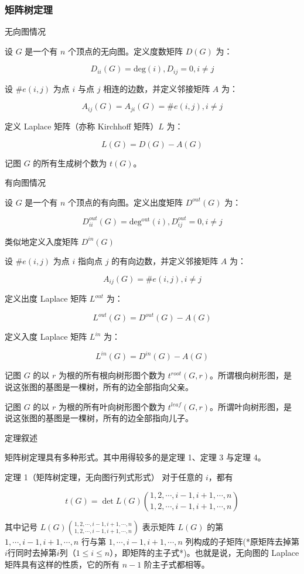 \documentclass[UTF8]{ctexart}
\begin{document}
\subsubsection{矩阵树定理}

无向图情况

设 $G$ 是一个有 $n$ 个顶点的无向图。定义度数矩阵 $D(G)$ 为：

$$
D_{ii}(G) = \mathrm{deg}(i), D_{ij} = 0, i\neq j
$$

设 $\#e(i,j)$ 为点 $i$ 与点 $j$ 相连的边数，并定义邻接矩阵 $A$ 为：

$$
A_{ij}(G)=A_{ji}(G)=\#e(i,j), i\neq j
$$

定义 Laplace 矩阵（亦称 Kirchhoff 矩阵）$L$ 为：

$$
L(G) = D(G) - A(G)
$$

记图 $G$ 的所有生成树个数为 $t(G)$。

有向图情况

设 $G$ 是一个有 $n$ 个顶点的有向图。定义出度矩阵 $D^{out}(G)$ 为：

$$
D^{out}_{ii}(G) = \mathrm{deg^{out}}(i), D^{out}_{ij} = 0, i\neq j
$$

类似地定义入度矩阵 $D^{in}(G)$

设 $\#e(i,j)$ 为点 $i$ 指向点 $j$ 的有向边数，并定义邻接矩阵 $A$ 为：

$$
A_{ij}(G)=\#e(i,j), i\neq j
$$

定义出度 Laplace 矩阵 $L^{out}$ 为：

$$
L^{out}(G) = D^{out}(G) - A(G)
$$

定义入度 Laplace 矩阵 $L^{in}$ 为：

$$
L^{in}(G) = D^{in}(G) - A(G)
$$

记图 $G$ 的以 $r$ 为根的所有根向树形图个数为 $t^{root}(G,r)$。所谓根向树形图，是说这张图的基图是一棵树，所有的边全部指向父亲。

记图 $G$ 的以 $r$ 为根的所有叶向树形图个数为 $t^{leaf}(G,r)$。所谓叶向树形图，是说这张图的基图是一棵树，所有的边全部指向儿子。

定理叙述

矩阵树定理具有多种形式。其中用得较多的是定理 1、定理 3 与定理 4。

定理 1（矩阵树定理，无向图行列式形式） 对于任意的 $i$，都有

$$
t(G) = \det L(G)\binom{1,2,\cdots,i-1,i+1,\cdots,n}{1,2,\cdots,i-1,i+1,\cdots,n}
$$

其中记号 $L(G)\binom{1,2,\cdots,i-1,i+1,\cdots,n}{1,2,\cdots,i-1,i+1,\cdots,n}$ 表示矩阵 $L(G)$ 的第 $1,\cdots,i-1,i+1,\cdots,n$ 行与第 $1,\cdots,i-1,i+1,\cdots,n$ 列构成的子矩阵(*原矩阵去掉第$i$行同时去掉第$i$列（$1\leq i\leq n$），即矩阵的主子式*)。也就是说，无向图的 Laplace 矩阵具有这样的性质，它的所有 $n-1$ 阶主子式都相等。
\end{document}
